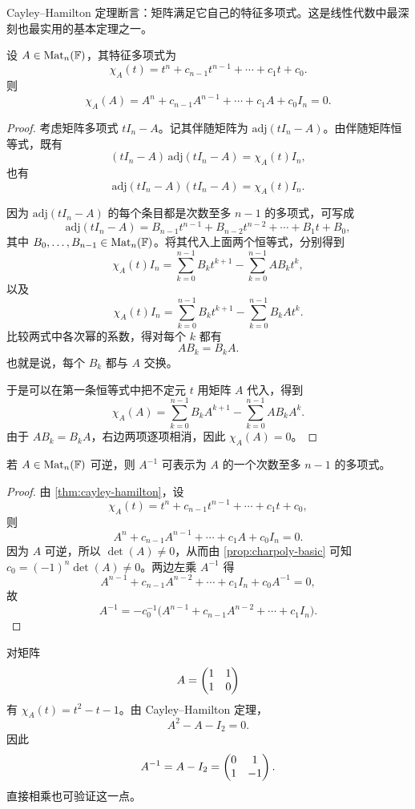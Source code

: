 Cayley--Hamilton 定理断言：矩阵满足它自己的特征多项式。这是线性代数中最深刻也最实用的基本定理之一。

\begin{theorem}\label{thm:cayley-hamilton}
设 \(A\in \mathrm{Mat}_n(\mathbb{F})\)，其特征多项式为
\[
\chi_A(t)=t^n+c_{n-1}t^{n-1}+\cdots+c_1t+c_0.
\]
则
\[
\chi_A(A)=A^n+c_{n-1}A^{n-1}+\cdots+c_1A+c_0I_n=0.
\]
\end{theorem}

\begin{proof}
考虑矩阵多项式 \(tI_n-A\)。记其伴随矩阵为 \(\mathrm{adj}(tI_n-A)\)。由伴随矩阵恒等式，既有
\[
(tI_n-A)\,\mathrm{adj}(tI_n-A)=\chi_A(t)I_n,
\]
也有
\[
\mathrm{adj}(tI_n-A)(tI_n-A)=\chi_A(t)I_n.
\]

因为 \(\mathrm{adj}(tI_n-A)\) 的每个条目都是次数至多 \(n-1\) 的多项式，可写成
\[
\mathrm{adj}(tI_n-A)=B_{n-1}t^{n-1}+B_{n-2}t^{n-2}+\cdots+B_1t+B_0,
\]
其中 \(B_0,\dots,B_{n-1}\in \mathrm{Mat}_n(\mathbb{F})\)。将其代入上面两个恒等式，分别得到
\[
\chi_A(t)I_n=\sum_{k=0}^{n-1} B_k t^{k+1}-\sum_{k=0}^{n-1}AB_k t^k,
\]
以及
\[
\chi_A(t)I_n=\sum_{k=0}^{n-1} B_k t^{k+1}-\sum_{k=0}^{n-1}B_kA t^k.
\]
比较两式中各次幂的系数，得对每个 \(k\) 都有
\[
AB_k=B_kA.
\]
也就是说，每个 \(B_k\) 都与 \(A\) 交换。

于是可以在第一条恒等式中把不定元 \(t\) 用矩阵 \(A\) 代入，得到
\[
\chi_A(A)=\sum_{k=0}^{n-1} B_k A^{k+1}-\sum_{k=0}^{n-1}AB_kA^k.
\]
由于 \(AB_k=B_kA\)，右边两项逐项相消，因此 \(\chi_A(A)=0\)。
\end{proof}

\begin{corollary}\label{cor:invertible-via-CH}
若 \(A\in \mathrm{Mat}_n(\mathbb{F})\) 可逆，则 \(A^{-1}\) 可表示为 \(A\) 的一个次数至多 \(n-1\) 的多项式。
\end{corollary}

\begin{proof}
由 \cref{thm:cayley-hamilton}，设
\[
\chi_A(t)=t^n+c_{n-1}t^{n-1}+\cdots+c_1t+c_0,
\]
则
\[
A^n+c_{n-1}A^{n-1}+\cdots+c_1A+c_0I_n=0.
\]
因为 \(A\) 可逆，所以 \(\det(A)\neq 0\)，从而由 \cref{prop:charpoly-basic} 可知 \(c_0=(-1)^n\det(A)\neq 0\)。两边左乘 \(A^{-1}\) 得
\[
A^{n-1}+c_{n-1}A^{n-2}+\cdots+c_1I_n+c_0A^{-1}=0,
\]
故
\[
A^{-1}=-c_0^{-1}\bigl(A^{n-1}+c_{n-1}A^{n-2}+\cdots+c_1I_n\bigr).
\]
\end{proof}

\begin{example}
对矩阵
\[
A=\begin{pmatrix} 1&1\\1&0 \end{pmatrix}
\]
有 \(\chi_A(t)=t^2-t-1\)。由 Cayley--Hamilton 定理，
\[
A^2-A-I_2=0.
\]
因此
\[
A^{-1}=A-I_2=\begin{pmatrix} 0&1\\1&-1 \end{pmatrix}.
\]
直接相乘也可验证这一点。
\end{example}


